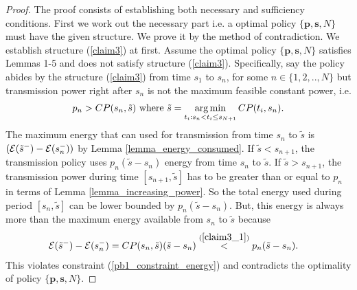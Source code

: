\begin{proof}
The proof consists of establishing both necessary and sufficiency conditions. First we work out the necessary part i.e. a optimal policy $\{\textbf{p},\textbf{s},N\}$ must have the given structure. We prove it by the method of  contradiction. We establish structure (\ref{claim3}) at first. Assume the optimal policy $\{\textbf{p},\textbf{s},N\}$ satisfies Lemmas 1-5 and does not satisfy structure (\ref{claim3}). Specifically, say the policy abides by the  structure (\ref{claim3}) from time $s_{1}$ to $s_n$, for some $n\in \{1,2,..,N\}$ but transmission power right after $s_n$ is not the maximum feasible constant power, i.e.
\begin{align}
p_n>CP(s_n,\tilde{s})\text{ where } \tilde{s}=\argmin_{t_i: s_n < t_i \le s_{N+1}} CP(t_i,s_n).\label{claim3_1}
\end{align}
The maximum energy that can used for transmission from time $s_{n}$ to $\tilde{s}$ is $\left(\mathcal{E}(\tilde{s}^-)-\mathcal{E}(s_{n}^-)\right)$ by Lemma \ref{lemma_energy_consumed}. If $\tilde{s}<s_{n+1}$, the transmission policy uses $p_n(\tilde{s}-s_{n})$ energy from time $s_n$ to $\tilde{s}$. If $\tilde{s}>s_{n+1}$, the transmission power during time $[s_{n+1},\tilde{s}]$ has to be greater than or equal to $p_n$ in terms of Lemma \ref{lemma_increasing_power}. So the total energy used during period $[s_n,\tilde{s}]$ can be lower bounded by $p_n(\tilde{s}-s_{n})$. But, this energy is always more than the maximum energy available from $s_{n}$ to $\tilde{s}$ because
\begin{align}
&\nonumber\mathcal{E}(\tilde{s}^-)-\mathcal{E}(s_{n}^-)=CP(s_n,\tilde{s})(\tilde{s}-s_{n})\stackrel{(\ref{claim3_1})}{<}p_n(\tilde{s}-s_{n}).
\end{align}
This violates constraint (\ref{pb1_constraint_energy}) and contradicts the optimality of policy $\{\textbf{p},\textbf{s},N\}$.
 

\end{proof}
